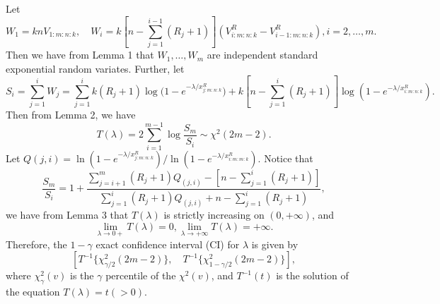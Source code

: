 \documentclass[12pt]{article}
\begin{document}
 Let
\begin{equation}\label{eq14}
W_1=k n V_{1:m:n:k},\quad W_i=k[n-\sum_{j=1}^{i-1}(R_j+1)](V_{i:m:n:k}^R-V_{{i-1}:m:n:k}^R),i=2,\ldots,m.
\end{equation}
Then we have from Lemma 1 that $W_1,\ldots,W_m$ are independent standard exponential random variates.
Further, let
$$S_i=\sum_{j=1}^i{W_j}=\sum\limits_{j=1}^i{k(R_j+1)\log(1-e^{-\lambda/x_{j:m:n:k}^R}})+k[n-\sum\limits_{j=1}^i (R_j+1)] \log(1-e^{{-\lambda}/{x_{i:m:n:k}^R}}).$$
Then from Lemma 2, we have
\begin{equation}\label{eq15}
T(\lambda)=2\sum_{i=1}^{m-1}\log\frac{S_m}{S_i} \sim \chi^2(2m-2).
\end{equation}
Let $Q(j,i)=\ln{(1-e^{{-\lambda}/{x_{j:m:n:k}^R}})}/\ln{(1-e^{{-\lambda}/{x_{i:m:m:k}^R}})}$.
Notice that
\begin{equation}\label{eq19}
\frac{S_m}{S_i}=1+\frac{\sum_{j=i+1}^{m}{(R_j+1)Q_{(j,i)}}-[n-{\sum_{j=1}^i{(R_j+1)}}]}{ \sum_{j=1}^{i}{(R_j+1)Q_{(j,i)}}+n-{\sum_{j=1}^i{(R_j+1)}}},
\end{equation}
we have from Lemma 3 that $T(\lambda)$ is strictly increasing on $(0,+\infty)$, and
$$\lim_{\lambda \rightarrow 0+}T(\lambda)=0, \lim_{\lambda \rightarrow +\infty}T(\lambda)=+\infty.$$
Therefore, the $1-\gamma$ exact confidence interval (CI) for $\lambda$ is given by
$$\left[ T^{-1}\{\chi_{\gamma/2}^2(2m-2)\},\quad T^{-1}\{\chi_{1-\gamma/2}^2(2m-2)\} \right],$$
where $\chi_{\gamma}^2(v)$ is the $\gamma$ percentile of the $\chi^2(v)$, and $T^{-1}(t)$ is the solution of the equation $T(\lambda)=t(>0)$.
\end{document}
